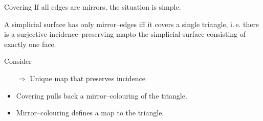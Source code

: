 \begin{frame}{Covering}
    \pause
    If all edges are mirrors, the situation is simple.
    \pause
    \begin{lem}
        A simplicial surface has only mirror--edges iff it covers a 
        single triangle\pause, i.\,e. there is a surjective incidence--preserving
        map\pause to the simplicial surface consisting of exactly one face.
    \end{lem}
    \pause
    Consider
        \begin{center}
        \end{center}
    \begin{itemize}
        \pause
        \item[$\Rightarrow$] Unique map that preserves incidence
        \pause
        \item Covering pulls back a mirror--colouring of the triangle.
        \pause
        \item Mirror--colouring defines a map to the triangle.
    \end{itemize}
\end{frame}


